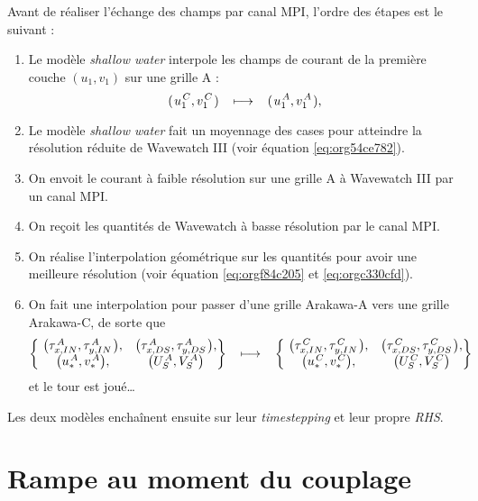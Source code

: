 \documentclass[10pt]{report}
\numberwithin{equation}{section}
\newcommand{\pt}{\hspace{1pt}} %
\begin{document}
Avant de réaliser l'échange des champs par canal MPI, l'ordre des étapes est le suivant :
\begin{enumerate}
\item Le modèle \emph{shallow water} interpole les champs de courant de la première couche \((u_1,v_1)\) sur une grille A :
\begin{equation}
   (\pt u_1^{\pt C},v_1^{\pt C}\pt) \hspace{0.3cm}\longmapsto \hspace{0.3cm} (\pt u_1^{\pt A},v_1^{\pt A}\pt),
\end{equation}
\item Le modèle \emph{shallow water} fait un moyennage des cases pour atteindre la résolution réduite de Wavewatch III (voir équation \ref{eq:org54ce782}).
\item On envoit le courant à faible résolution sur une grille A à Wavewatch III par un canal MPI.
\item On reçoit les quantités de Wavewatch à basse résolution par le canal MPI.
\item On réalise l'interpolation géométrique sur les quantités pour avoir une meilleure résolution (voir équation \ref{eq:orgf84c205} et \ref{eq:orgc330cfd}).
\item On fait une interpolation pour passer d'une grille Arakawa-A vers une grille Arakawa-C, de sorte que
\begin{equation}\qty{\
   \begin{matrix}
     \qty(\tau_{x,IN}^{\pt A},\tau_{y,IN}^{\pt A}\pt), &
     \qty(\tau_{x,DS}^{\pt A},\tau_{y,DS}^{\pt A}\pt), \\
     \qty(u_*^{\pt A},v_*^{\pt A}),   &
     \qty(U_S^{\pt A},V_S^{\pt A})
   \end{matrix}}
   \hspace{0.3cm}\longmapsto \hspace{0.3cm}\qty{\
   \begin{matrix}
     \qty(\tau_{x,IN}^{\pt C},\tau_{y,IN}^{\pt C}\pt), &
     \qty(\tau_{x,DS}^{\pt C},\tau_{y,DS}^{\pt C}\pt), \\
     \qty(u_*^{\pt C},v_*^{\pt C}),   &
     \qty(U_S^{\pt C},V_S^{\pt C})
   \end{matrix}}
   \end{equation}
et le tour est joué\ldots{}\bigskip
\end{enumerate}

Les deux modèles enchaînent ensuite sur leur \emph{timestepping} et leur propre \emph{RHS}.
\section{Rampe au moment du couplage}
\label{sec:org5ac4cc1}
\end{document}
